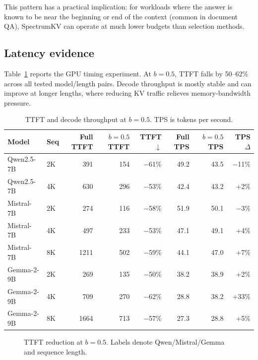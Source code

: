 \documentclass[11pt]{article}
\newcommand{\method}{SpectrumKV}
\newcommand{\budget}{b}
\newcommand{\pct}{\%}
\theoremstyle{plain}
\theoremstyle{definition}
\begin{document}
This pattern has a practical implication: for workloads where the answer is known to be near the beginning or end of the context (common in document QA), \method{} can operate at much lower budgets than selection methods.

\subsection{Latency evidence}
\label{sec:rq9}

Table~\ref{tab:latency} reports the GPU timing experiment.  At $\budget=0.5$, TTFT falls by 50--62\pct{} across all tested model/length pairs.  Decode throughput is mostly stable and can improve at longer lengths, where reducing KV traffic relieves memory-bandwidth pressure.

\begin{table}[t]
\centering
\caption{TTFT and decode throughput at $\budget=0.5$.  TPS is tokens per second.}
\label{tab:latency}
\small
\begin{tabular}{llrrrrrr}
\toprule
Model & Seq & Full TTFT & $\budget=0.5$ TTFT & TTFT $\downarrow$ & Full TPS & $\budget=0.5$ TPS & TPS $\Delta$ \\
\midrule
Qwen2.5-7B & 2K & 391 & 154 & $-$61\pct{} & 49.2 & 43.5 & $-$11\pct{} \\
Qwen2.5-7B & 4K & 630 & 296 & $-$53\pct{} & 42.4 & 43.2 & +2\pct{} \\
Mistral-7B & 2K & 274 & 116 & $-$58\pct{} & 51.9 & 50.1 & $-$3\pct{} \\
Mistral-7B & 4K & 497 & 233 & $-$53\pct{} & 47.1 & 49.1 & +4\pct{} \\
Mistral-7B & 8K & 1211 & 502 & $-$59\pct{} & 44.1 & 47.0 & +7\pct{} \\
Gemma-2-9B & 2K & 269 & 135 & $-$50\pct{} & 38.2 & 38.9 & +2\pct{} \\
Gemma-2-9B & 4K & 709 & 270 & $-$62\pct{} & 28.8 & 38.2 & +33\pct{} \\
Gemma-2-9B & 8K & 1664 & 713 & $-$57\pct{} & 27.3 & 28.8 & +5\pct{} \\
\bottomrule
\end{tabular}
\end{table}

\begin{figure}[t]
\centering
{}
\caption{TTFT reduction at $\budget=0.5$.  Labels denote Qwen/Mistral/Gemma and sequence length.}
\label{fig:ttft}
\end{figure}
\end{document}
